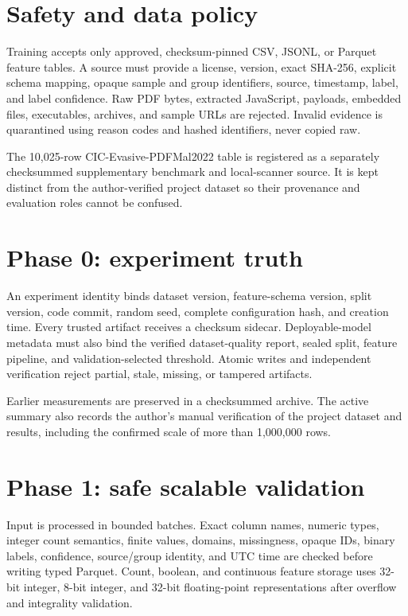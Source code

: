 \documentclass[11pt,a4paper]{article}
\begin{document}
\section{Safety and data policy}

Training accepts only approved, checksum-pinned CSV, JSONL, or Parquet feature
tables. A source must provide a license, version, exact SHA-256, explicit schema
mapping, opaque sample and group identifiers, source, timestamp, label, and label
confidence. Raw PDF bytes, extracted JavaScript, payloads, embedded files,
executables, archives, and sample URLs are rejected. Invalid evidence is
quarantined using reason codes and hashed identifiers, never copied raw.

The 10,025-row CIC-Evasive-PDFMal2022 table \cite{cic_dataset,ccl_pdf} is registered as a
separately checksummed supplementary benchmark and local-scanner source. It is
kept distinct from the author-verified project dataset so their provenance and
evaluation roles cannot be confused.

\section{Phase 0: experiment truth}

An experiment identity binds dataset version, feature-schema version, split
version, code commit, random seed, complete configuration hash, and creation
time. Every trusted artifact receives a checksum sidecar. Deployable-model
metadata must also bind the verified dataset-quality report, sealed split,
feature pipeline, and validation-selected threshold. Atomic writes and
independent verification reject partial, stale, missing, or tampered artifacts.

Earlier measurements are preserved in a checksummed archive. The active summary
also records the author's manual verification of the project dataset and results,
including the confirmed scale of more than 1,000,000 rows.

\section{Phase 1: safe scalable validation}

Input is processed in bounded batches. Exact column names, numeric types,
integer count semantics, finite values, domains, missingness, opaque IDs, binary
labels, confidence, source/group identity, and UTC time are checked before
writing typed Parquet. Count, boolean, and continuous feature storage uses
32-bit integer, 8-bit integer, and 32-bit floating-point representations after
overflow and integrality validation.
\end{document}
